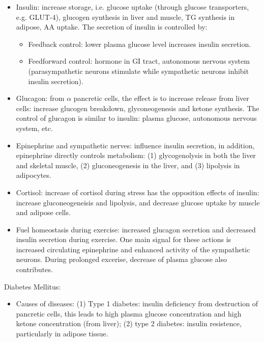 \documentclass{report}
\begin{document}
\begin{enumerate}
\begin{itemize}
\item Insulin: increase storage, i.e. glucose uptake (through glucose transporters, e.g. GLUT-4), glucogen synthesis in liver and muscle, TG synthesis in adipose, AA uptake. The secretion of insulin is controlled by: 
\begin{itemize}
	\item Feedback control: lower plasma glucose level increases insulin secretion. 
	\item Feedforward control: hormone in GI tract, autonomous nervous system (parasympathetic neurons stimulate while sympathetic neurons inhibit insulin secretion). 
\end{itemize}

\item Glucagon: from $\alpha$ pancretic cells, the effect is to increase release from liver cells: increase glucogen breakdown, glyconeogenesis and ketone synthesis. The control of glucagon is similar to insulin: plasma glucose, autonomous nervous system, etc. 

\item Epinephrine and sympathetic nerves: influence insulin secretion, in addition, epinephrine directly controls metabolism: (1) glycogenolysis in both the liver and skeletal muscle, (2) gluconeogenesis in the liver, and (3) lipolysis in adipocytes.

\item Cortisol: increase of cortisol during stress has the opposition effects of insulin: increase gluconeogeneisis and lipolysis, and decrease glucose uptake by muscle and adipose cells. 

\item Fuel homeostasis during exercise: increased glucagon secretion and decreased insulin secretion during exercise. One main signal for these actions is increased circulating epinephrine and enhanced activity of the sympathetic neurons. During prolonged excerise, decrease of plasma glucose also contributes.
\end{itemize}

Diabetes Mellitus: 
\begin{itemize}
\item Causes of diseases: (1) Type 1 diabetes: insulin deficiency from destruction of pancretic cells, this leads to high plasma glucose concentration and high ketone concentration (from liver); (2) type 2 diabetes: insulin resistence, particularly in adipose tissue.


\end{itemize}
\end{enumerate}
\end{document}
